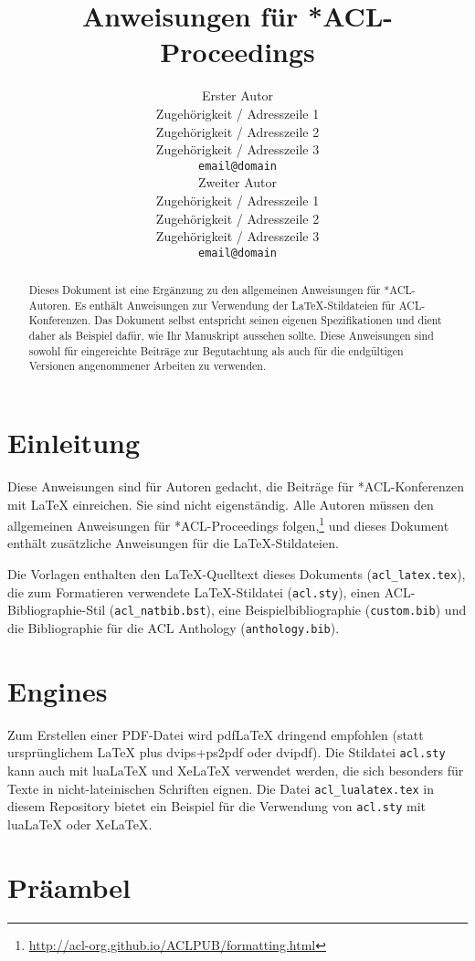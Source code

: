 \documentclass[11pt]{article}
\title{Anweisungen für *ACL-Proceedings}
\author{Erster Autor \\
  Zugehörigkeit / Adresszeile 1 \\
  Zugehörigkeit / Adresszeile 2 \\
  Zugehörigkeit / Adresszeile 3 \\
  \texttt{email@domain} \\\And
  Zweiter Autor \\
  Zugehörigkeit / Adresszeile 1 \\
  Zugehörigkeit / Adresszeile 2 \\
  Zugehörigkeit / Adresszeile 3 \\
  \texttt{email@domain} \\}
\begin{document}
\maketitle
\begin{abstract}
Dieses Dokument ist eine Ergänzung zu den allgemeinen Anweisungen für *ACL-Autoren. Es enthält Anweisungen zur Verwendung der \LaTeX{}-Stildateien für ACL-Konferenzen.
Das Dokument selbst entspricht seinen eigenen Spezifikationen und dient daher als Beispiel dafür, wie Ihr Manuskript aussehen sollte.
Diese Anweisungen sind sowohl für eingereichte Beiträge zur Begutachtung als auch für die endgültigen Versionen angenommener Arbeiten zu verwenden.
\end{abstract}

\section{Einleitung}

Diese Anweisungen sind für Autoren gedacht, die Beiträge für *ACL-Konferenzen mit \LaTeX{} einreichen. Sie sind nicht eigenständig. Alle Autoren müssen den allgemeinen Anweisungen für *ACL-Proceedings folgen,\footnote{\url{http://acl-org.github.io/ACLPUB/formatting.html}} und dieses Dokument enthält zusätzliche Anweisungen für die \LaTeX{}-Stildateien.

Die Vorlagen enthalten den \LaTeX{}-Quelltext dieses Dokuments (\texttt{acl\_latex.tex}),
die zum Formatieren verwendete \LaTeX{}-Stildatei (\texttt{acl.sty}),
einen ACL-Bibliographie-Stil (\texttt{acl\_natbib.bst}),
eine Beispielbibliographie (\texttt{custom.bib})
und die Bibliographie für die ACL Anthology (\texttt{anthology.bib}).

\section{Engines}

Zum Erstellen einer PDF-Datei wird pdf\LaTeX{} dringend empfohlen (statt ursprünglichem \LaTeX{} plus dvips+ps2pdf oder dvipdf).
Die Stildatei \texttt{acl.sty} kann auch mit
lua\LaTeX{} und
Xe\LaTeX{} verwendet werden, die sich besonders für Texte in nicht-lateinischen Schriften eignen.
Die Datei \texttt{acl\_lualatex.tex} in diesem Repository bietet
ein Beispiel für die Verwendung von \texttt{acl.sty} mit
lua\LaTeX{} oder
Xe\LaTeX{}.

\section{Präambel}
\end{document}
